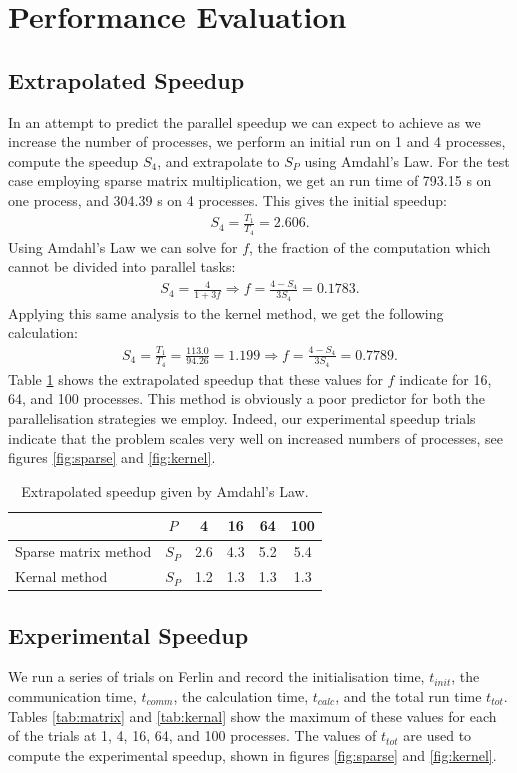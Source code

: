 \documentclass[a4paper,11pt]{article}
\newcommand{\ba}[1]{\begin{align*}    #1    \end{align*}}
\begin{document}
\section*{Performance Evaluation}
\subsection*{Extrapolated Speedup}
In an attempt to predict the parallel speedup we can expect to achieve as we increase the number of processes, we perform an initial run on 1 and 4 processes, compute the speedup $S_4$, and extrapolate to $S_P$ using Amdahl's Law.  For the test case employing sparse matrix multiplication, we get an run time of 793.15 s on one process, and 304.39 s on 4 processes.  This gives the initial speedup:
\ba{
S_4 = \frac{T_1}{T_4} = 2.606.
}
Using Amdahl's Law we can solve for $f$, the fraction of the computation which cannot be divided into parallel tasks:
\ba{
S_4 = \frac{4}{1+3f} \Rightarrow f = \frac{4-S_4}{3S_4} = 0.1783.
}
Applying this same analysis to the kernel method, we get the following calculation:
\ba{
S_4 = \frac{T_1}{T_4} = \frac{113.0}{94.26} =  1.199 \Rightarrow f = \frac{4-S_4}{3S_4} = 0.7789.
}
Table \ref{tab:S_extrap} shows the extrapolated speedup that these values for $f$ indicate for 16, 64, and 100 processes.  This method is obviously a poor predictor for both the parallelisation strategies we employ.  Indeed, our experimental speedup trials indicate that the problem scales very well on increased numbers of processes, see figures \ref{fig:sparse} and \ref{fig:kernel}.

\begin{table}[h]
\def\arraystretch{1.2}
\begin{center}
\caption{Extrapolated speedup given by Amdahl's Law.}
\label{tab:S_extrap}
\begin{tabular}{| l | c | c | c | c | c |}
\hline
&$P$ & 4 & 16 & 64 & 100 \\
\hline
Sparse matrix method & $S_P $& 2.6 & 4.3 & 5.2 & 5.4\\
\hline
Kernal method & $S_P $& 1.2 & 1.3 & 1.3 & 1.3\\
\hline
\end{tabular}
\end{center}
\end{table}

\subsection*{Experimental Speedup}
We run a series of trials on Ferlin and record the initialisation time, $t_{init}$, the communication time, $t_{comm}$, the calculation time, $t_{calc}$, and the total run time $t_{tot}$.  Tables \ref{tab:matrix} and \ref{tab:kernal} show the maximum of these values for each of the trials at 1, 4, 16, 64, and 100 processes.  The values of $t_{tot}$ are used to compute the experimental speedup, shown in figures \ref{fig:sparse} and \ref{fig:kernel}.
\end{document}

